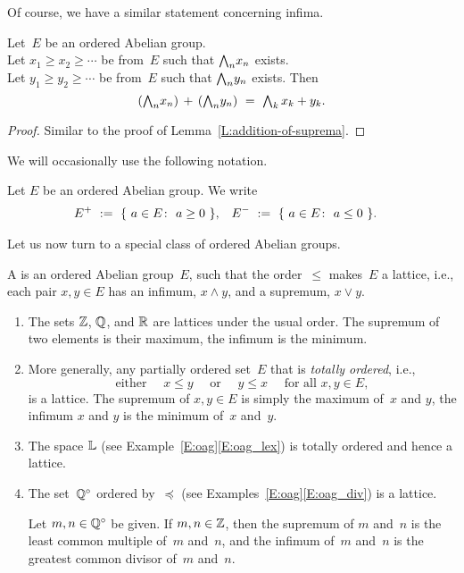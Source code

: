 \noindent
Of course,
we have a similar statement concerning infima.
\begin{lem}
\label{L:addition-of-infima}
Let~$E$ be an ordered Abelian group.\\
Let $x_1 \geq x_2 \geq \dotsb$
be from~$E$ such that $\textstyle{\bigwedge}_n x_n$ exists.\\
Let $y_1 \geq y_2 \geq \dotsb$
be from~$E$ such that $\textstyle{\bigwedge}_n y_n$ exists.
Then
\begin{equation*}
(\bw_n x_n) \,+\, (\bw_n y_n)
\ =\ 
\bw_k\, x_k + y_k.
\end{equation*}
\end{lem}
\begin{proof}
Similar to the proof of Lemma~\ref{L:addition-of-suprema}.
\end{proof}
%
%
\noindent
We will occasionally use the following notation.
\begin{dfn}
Let $E$ be an ordered Abelian group.
We write
\begin{align*}
E^+ \ &:=\ \{\  a\in E\colon\  a\geq 0\ \},&
E^- \ &:=\ \{\  a\in E\colon\  a\leq 0\ \}.
\end{align*}
\end{dfn}
%
\noindent
Let us now turn to a special class of ordered Abelian groups.
%
%
\begin{dfn}
\label{D:loag}
A 
is an ordered Abelian group~$E$,
such that the order~$\leq$ 
makes~$E$ a lattice,
i.e., each pair $x,y\in E$
has an infimum, $x\wedge y$,
and a supremum, $x\vee y$.
\end{dfn}
\begin{exs}
\label{E:loag}
\begin{enumerate}
\item
The sets
$\mathbb{Z}$, $\mathbb{Q}$, and $\mathbb{R}$ are lattices
under the usual order.
The supremum of two elements is their maximum,
the infimum is the minimum.

\item
More generally,
any partially ordered set~$E$
that is \emph{totally ordered},
i.e.,
\begin{equation*}
\text{either } \quad x\leq y\quad\text{ or } 
\quad y\leq x\quad \text{ for all }x,y\in E,
\end{equation*}
is a lattice.
The supremum of $x,y\in E$ is simply the maximum of~$x$ and $y$,
the infimum $x$ and $y$ is the minimum of~$x$ and~$y$.

\item
The space $\mathbb{L}$
(see Example~\ref{E:oag}\ref{E:oag_lex})
is totally ordered and hence a lattice.

\item
\label{E:loag_div}
The set~$\mathbb{Q}^\circ$ ordered by~$\preccurlyeq$
(see Examples~\ref{E:oag}\ref{E:oag_div})
is a lattice.

Let $m,n\in \mathbb{Q}^\circ$ be given.
If $m,n\in \mathbb{Z}$, then the supremum of $m$ and~$n$
is the least common multiple of~$m$ and~$n$,
and the infimum of~$m$ and~$n$ is the greatest common divisor
of~$m$ and~$n$.

\end{enumerate}
\end{exs}

